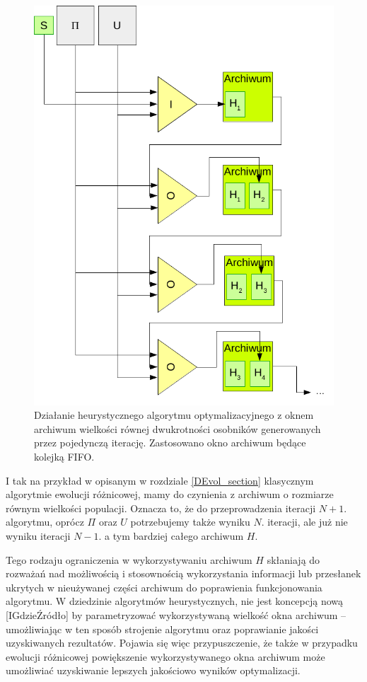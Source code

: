 \documentclass[12pt,a4paper]{report}
\begin{document}
{{%
\begin{figure}[htb]
\begin{center}\includegraphics[scale=0.5]{img/ModelArchiwumFIFO2}\end{center}
\caption{Działanie heurystycznego algorytmu optymalizacyjnego z oknem archiwum wielkości równej dwukrotności osobników generowanych przez pojedynczą iterację. Zastosowano okno archiwum będące kolejką FIFO.}
\label{ModelArchiwumImg}
\end{figure}

\par{
I tak na przykład w opisanym w rozdziale \ref{DEvol_section} klasycznym algorytmie ewolucji różnicowej, mamy do czynienia z archiwum o rozmiarze równym wielkości populacji. Oznacza to, że do przeprowadzenia iteracji $N+1.$ algorytmu, oprócz $\Pi$ oraz $U$ potrzebujemy także wyniku $N.$ iteracji, ale już nie wyniku iteracji $N-1$. a tym bardziej całego archiwum $H$.
}
\par{
Tego rodzaju ograniczenia w wykorzystywaniu archiwum $H$ skłaniają do rozważań nad możliwością i stosownością wykorzystania informacji lub przesłanek ukrytych w nieużywanej części archiwum do poprawienia funkcjonowania algorytmu. W dziedzinie algorytmów heurystycznych, nie jest koncepcją nową [IGdzieŹródło] by parametryzować wykorzystywaną wielkość okna archiwum -- umożliwiając w ten sposób strojenie algorytmu oraz poprawianie jakości uzyskiwanych rezultatów. Pojawia się więc przypuszczenie, że także w przypadku ewolucji różnicowej powiększenie wykorzystywanego okna archiwum może umożliwiać uzyskiwanie lepszych jakościowo wyników optymalizacji.
}


}}
\end{document}

